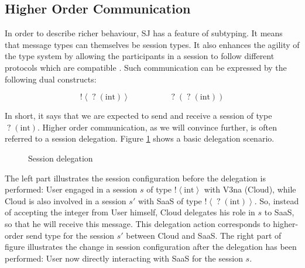 \documentclass{llncs}
\begin{document}
\subsection{Higher Order Communication}
In order to describe richer behaviour, SJ has a feature of subtyping. It means that message types can themselves be session types. It also enhances the agility of the type system by allowing the participants in a session to follow different protocols which are compatible \cite{higher-order-comm}. Such communication can be expressed by the following dual constructs:

\begin{equation*}
\mathopen{!}\left<\mathopen{?}\left(\text{int}\right)\right> \hspace{2cm} \mathopen{?}\left(\mathopen{?}\left(\text{int}\right)\right)
\end{equation*}

In short, it says that we are expected to send and receive a session of type $\mathopen{?}\left(\text{int}\right)$. Higher order communication, as we will convince further, is often referred to a session delegation. Figure \ref{fig:sj-delegation} shows a basic delegation scenario.

\begin{figure}[ht]
\centering
{}
\caption{Session delegation}\label{fig:sj-delegation}
\end{figure}

The left part illustrates the session configuration before the delegation is performed: User engaged in a session $s$ of type $\mathopen{!}\left<\text{int}\right>$ with V3na (Cloud), while Cloud is also involved in a session $s'$ with SaaS of type $\mathopen{!}\left<\mathopen{?}\left(\text{int}\right)\right>$. So, instead of accepting the integer from User himself, Cloud delegates his role in $s$ to SaaS, so that he will receive this message. This delegation action corresponds to higher-order send type for the session $s'$ between Cloud and SaaS. The right part of figure illustrates the change in session configuration after the delegation has been performed: User now directly interacting with SaaS for the session $s$.
\end{document}
